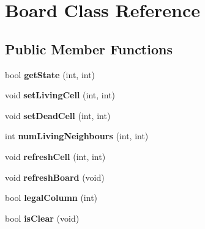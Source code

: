 \hypertarget{class_board}{\section{Board Class Reference}
\label{class_board}
}
\subsection*{Public Member Functions}
\begin{DoxyCompactItemize}
\item 
\hypertarget{class_board_a1f0fa2da72d6b2b468429cf0958f8b78}{bool {\bfseries get\+State} (int, int)}\label{class_board_a1f0fa2da72d6b2b468429cf0958f8b78}

\item 
\hypertarget{class_board_a42e93605cefa1b1d704f9feb9879ac85}{void {\bfseries set\+Living\+Cell} (int, int)}\label{class_board_a42e93605cefa1b1d704f9feb9879ac85}

\item 
\hypertarget{class_board_aa9a9eaf138ff5af3869128188605d917}{void {\bfseries set\+Dead\+Cell} (int, int)}\label{class_board_aa9a9eaf138ff5af3869128188605d917}

\item 
\hypertarget{class_board_a81f1fb49a1d636a26540f6d9d5b100fb}{int {\bfseries num\+Living\+Neighbours} (int, int)}\label{class_board_a81f1fb49a1d636a26540f6d9d5b100fb}

\item 
\hypertarget{class_board_a62c179eb341c6b41bc89382f7a73da97}{void {\bfseries refresh\+Cell} (int, int)}\label{class_board_a62c179eb341c6b41bc89382f7a73da97}

\item 
\hypertarget{class_board_a76067c983fdc7641e3283d8d0699028c}{void {\bfseries refresh\+Board} (void)}\label{class_board_a76067c983fdc7641e3283d8d0699028c}

\item 
\hypertarget{class_board_a7fcb361b4c58c2ae650733d3d13a1202}{bool {\bfseries legal\+Column} (int)}\label{class_board_a7fcb361b4c58c2ae650733d3d13a1202}

\item 
\hypertarget{class_board_ad020f8b03af4e5b43f0d054f7c3fa2b3}{bool {\bfseries is\+Clear} (void)}\label{class_board_ad020f8b03af4e5b43f0d054f7c3fa2b3}

\end{DoxyCompactItemize}
